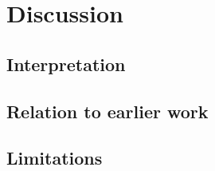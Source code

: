 \section{Discussion}
\label{sec:discussion}

\subsection{Interpretation}
\label{sec:discussion-interpretation}

\subsection{Relation to earlier work}
\label{sec:discussion-related}

\subsection{Limitations}
\label{sec:discussion-limitations}
